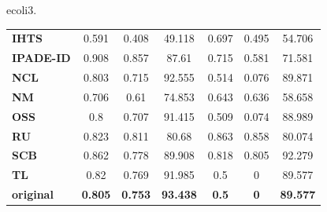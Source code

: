 \documentclass[10pt]{beamer}
\begin{document}
\begin{frame}{ecoli3.}
{\begin{tabular}{l|cccccc}
\textbf{IHTS} & \cellcolor[rgb]{ .353,  .541,  .776}0.591 & \cellcolor[rgb]{ .353,  .541,  .776}0.408 & \cellcolor[rgb]{ .353,  .541,  .776}49.118 & \cellcolor[rgb]{ .988,  .988,  1}0.697 & \cellcolor[rgb]{ .894,  .922,  .965}0.495 & \cellcolor[rgb]{ .353,  .541,  .776}54.706 \\
\textbf{IPADE-ID} & \cellcolor[rgb]{ .973,  .412,  .42}0.908 & \cellcolor[rgb]{ .976,  .42,  .427}0.857 & \cellcolor[rgb]{ .984,  .722,  .729}87.61 & \cellcolor[rgb]{ .988,  .933,  .945}0.715 & \cellcolor[rgb]{ .988,  .988,  1}0.581 & \cellcolor[rgb]{ .749,  .82,  .914}71.581 \\
\textbf{NCL} & \cellcolor[rgb]{ .976,  .976,  .992}0.803 & \cellcolor[rgb]{ .91,  .933,  .973}0.715 & \cellcolor[rgb]{ .973,  .412,  .42}92.555 & \cellcolor[rgb]{ .396,  .573,  .792}0.514 & \cellcolor[rgb]{ .435,  .596,  .804}0.076 & \cellcolor[rgb]{ .976,  .541,  .553}89.871 \\
\textbf{NM} & \cellcolor[rgb]{ .69,  .776,  .894}0.706 & \cellcolor[rgb]{ .718,  .796,  .902}0.61 & \cellcolor[rgb]{ .831,  .875,  .941}74.853 & \cellcolor[rgb]{ .812,  .863,  .937}0.643 & \cellcolor[rgb]{ .988,  .882,  .894}0.636 & \cellcolor[rgb]{ .443,  .604,  .808}58.658 \\
\textbf{OSS} & \cellcolor[rgb]{ .965,  .973,  .992}0.8 & \cellcolor[rgb]{ .894,  .922,  .965}0.707 & \cellcolor[rgb]{ .976,  .486,  .494}91.415 & \cellcolor[rgb]{ .38,  .561,  .784}0.509 & \cellcolor[rgb]{ .431,  .596,  .804}0.074 & \cellcolor[rgb]{ .98,  .592,  .6}88.989 \\
\textbf{RU} & \cellcolor[rgb]{ .988,  .898,  .91}0.823 & \cellcolor[rgb]{ .98,  .682,  .69}0.811 & \cellcolor[rgb]{ .937,  .953,  .98}80.68 & \cellcolor[rgb]{ .976,  .478,  .486}0.863 & \cellcolor[rgb]{ .976,  .455,  .463}0.858 & \cellcolor[rgb]{ .953,  .961,  .984}80.074 \\
\textbf{SCB} & \cellcolor[rgb]{ .98,  .675,  .686}0.862 & \cellcolor[rgb]{ .988,  .871,  .882}0.778 & \cellcolor[rgb]{ .98,  .576,  .588}89.908 & \cellcolor[rgb]{ .98,  .616,  .627}0.818 & \cellcolor[rgb]{ .976,  .557,  .565}0.805 & \cellcolor[rgb]{ .973,  .412,  .42}92.279 \\
\textbf{TL} & \cellcolor[rgb]{ .988,  .918,  .925}0.82 & \cellcolor[rgb]{ .988,  .922,  .933}0.769 & \cellcolor[rgb]{ .976,  .451,  .459}91.985 & \cellcolor[rgb]{ .353,  .541,  .776}0.5 & \cellcolor[rgb]{ .353,  .541,  .776}0 & \cellcolor[rgb]{ .98,  .557,  .569}89.577 \\
\midrule
\textbf{original} & \textbf{0.805} & \textbf{0.753} & \textbf{93.438} & \textbf{0.5} & \textbf{0} & \textbf{89.577} \\
\end{tabular}}
\end{frame}
\end{document}
